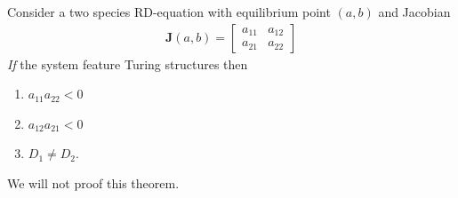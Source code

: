 \begin{theorem}
	\label{th:turing}
	Consider a two species RD-equation with equilibrium point $(a,b)$ and Jacobian
	\begin{eqnarray}
		\mathbf{J}(a,b) = 
		\left[	\begin{matrix}
			a_{11} & a_{12} \\
			a_{21} & a_{22}
		\end{matrix}
		\right]
	\end{eqnarray}
	\emph{If} the system feature Turing structures then
	\begin{enumerate}
		\item $a_{11} a_{22} < 0 $
		\item $a_{12} a_{21} < 0 $
		\item $D_1 \neq D_2$.
	\end{enumerate}
	We will not proof this theorem.
\end{theorem}

